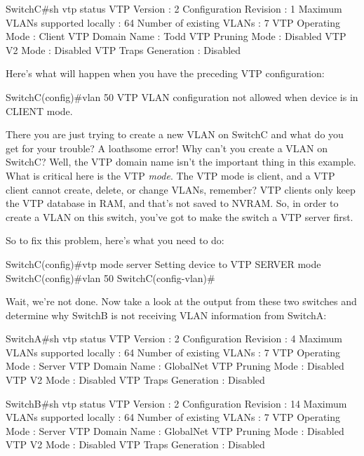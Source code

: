 \begin{cli}
SwitchC#sh vtp status
VTP Version                     : 2
Configuration Revision          : 1
Maximum VLANs supported locally : 64
Number of existing VLANs        : 7
VTP Operating Mode              : Client
VTP Domain Name                 : Todd
VTP Pruning Mode                : Disabled
VTP V2 Mode                     : Disabled
VTP Traps Generation            : Disabled
\end{cli}

Here's what will happen when you have the preceding VTP configuration:

\begin{cli}
SwitchC(config)#vlan 50
VTP VLAN configuration not allowed when device is in CLIENT mode.
\end{cli}

There you are just
trying to create a new VLAN on SwitchC and what do you get for your
trouble? A loathsome error! Why can't you create a VLAN on SwitchC?
Well, the VTP domain name isn't the important thing in this example.
What is critical here is the VTP \emph{mode}. The VTP mode is client,
and a VTP client cannot create, delete, or change VLANs, remember? VTP
clients only keep the VTP database in RAM, and that's not saved to
NVRAM. So, in order to create a VLAN on this switch, you've got to make
the switch a VTP server first.

So to fix this problem, here's what you need to do:

\begin{cli}
SwitchC(config)#vtp mode server
Setting device to VTP SERVER mode
SwitchC(config)#vlan 50
SwitchC(config-vlan)#
\end{cli}

Wait, we're not done. Now take a look at the output from these two
switches and determine why SwitchB is not receiving VLAN information
from SwitchA:

\begin{cli}
SwitchA#sh vtp status
VTP Version                     : 2
Configuration Revision          : 4
Maximum VLANs supported locally : 64
Number of existing VLANs        : 7
VTP Operating Mode              : Server
VTP Domain Name                 : GlobalNet
VTP Pruning Mode                : Disabled
VTP V2 Mode                     : Disabled
VTP Traps Generation            : Disabled
 
SwitchB#sh vtp status
VTP Version                     : 2
Configuration Revision          : 14
Maximum VLANs supported locally : 64
Number of existing VLANs        : 7
VTP Operating Mode              : Server
VTP Domain Name                 : GlobalNet
VTP Pruning Mode                : Disabled
VTP V2 Mode                     : Disabled
VTP Traps Generation            : Disabled
\end{cli}

